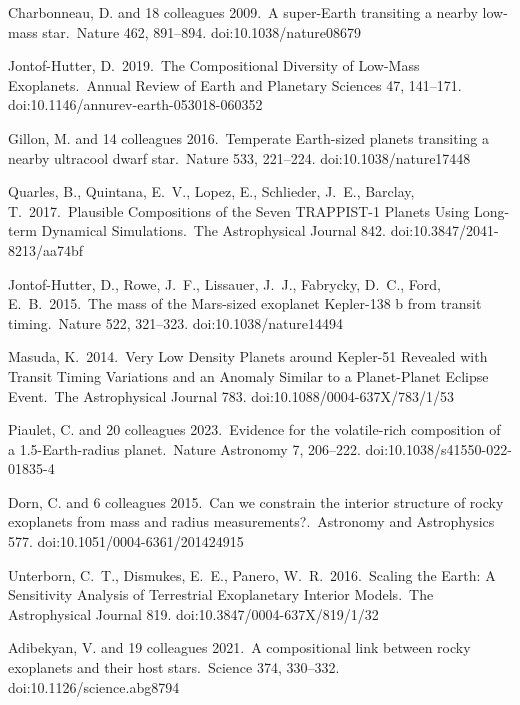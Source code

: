  Charbonneau, D. and 18 colleagues 2009.\ A super-Earth transiting a nearby low-mass star.\ Nature 462, 891–894. doi:10.1038/nature08679


 Jontof-Hutter, D.\ 2019.\ The Compositional Diversity of Low-Mass Exoplanets.\ Annual Review of Earth and Planetary Sciences 47, 141–171. doi:10.1146/annurev-earth-053018-060352

 Gillon, M. and 14 colleagues 2016.\ Temperate Earth-sized planets transiting a nearby ultracool dwarf star.\ Nature 533, 221–224. doi:10.1038/nature17448


 Quarles, B., Quintana, E.~V., Lopez, E., Schlieder, J.~E., Barclay, T.\ 2017.\ Plausible Compositions of the Seven TRAPPIST-1 Planets Using Long-term Dynamical Simulations.\ The Astrophysical Journal 842. doi:10.3847/2041-8213/aa74bf

 Jontof-Hutter, D., Rowe, J.~F., Lissauer, J.~J., Fabrycky, D.~C., Ford, E.~B.\ 2015.\ The mass of the Mars-sized exoplanet Kepler-138 b from transit timing.\ Nature 522, 321–323. doi:10.1038/nature14494


 Masuda, K.\ 2014.\ Very Low Density Planets around Kepler-51 Revealed with Transit Timing Variations and an Anomaly Similar to a Planet-Planet Eclipse Event.\ The Astrophysical Journal 783. doi:10.1088/0004-637X/783/1/53


 Piaulet, C. and 20 colleagues 2023.\ Evidence for the volatile-rich composition of a 1.5-Earth-radius planet.\ Nature Astronomy 7, 206–222. doi:10.1038/s41550-022-01835-4


 Dorn, C. and 6 colleagues 2015.\ Can we constrain the interior structure of rocky exoplanets from mass and radius measurements?.\ Astronomy and Astrophysics 577. doi:10.1051/0004-6361/201424915


 Unterborn, C.~T., Dismukes, E.~E., Panero, W.~R.\ 2016.\ Scaling the Earth: A Sensitivity Analysis of Terrestrial Exoplanetary Interior Models.\ The Astrophysical Journal 819. doi:10.3847/0004-637X/819/1/32


 Adibekyan, V. and 19 colleagues 2021.\ A compositional link between rocky exoplanets and their host stars.\ Science 374, 330–332. doi:10.1126/science.abg8794

